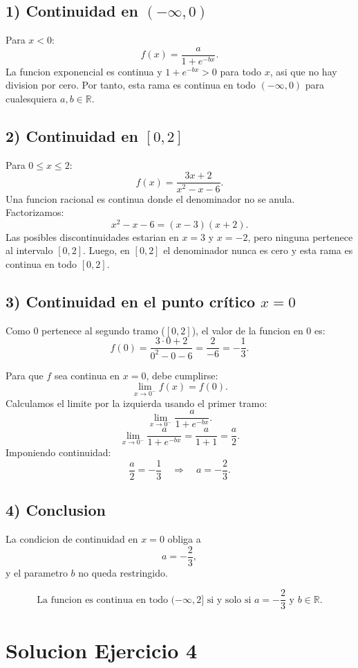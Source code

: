 \documentclass[12pt]{article}
\begin{document}
\subsection*{1) Continuidad en $(-\infty,0)$}
Para $x<0$:
\[
f(x)=\frac{a}{1+e^{-bx}}.
\]
La funcion exponencial es continua y $1+e^{-bx}>0$ para todo $x$, asi que no hay division por cero.
Por tanto, esta rama es continua en todo $(-\infty,0)$ para cualesquiera $a,b\in\mathbb{R}$.

\subsection*{2) Continuidad en $[0,2]$}
Para $0\le x\le 2$:
\[
f(x)=\frac{3x+2}{x^2-x-6}.
\]
Una funcion racional es continua donde el denominador no se anula. Factorizamos:
\[
x^2-x-6=(x-3)(x+2).
\]
Las posibles discontinuidades estarian en $x=3$ y $x=-2$, pero ninguna pertenece al intervalo $[0,2]$.
Luego, en $[0,2]$ el denominador nunca es cero y esta rama es continua en todo $[0,2]$.

\subsection*{3) Continuidad en el punto crítico $x=0$}
Como $0$ pertenece al segundo tramo ($[0,2]$), el valor de la funcion en $0$ es:
\[
f(0)=\frac{3\cdot 0+2}{0^2-0-6}=\frac{2}{-6}=-\frac{1}{3}.
\]

Para que $f$ sea continua en $x=0$, debe cumplirse:
\[
\lim_{x\to 0^-} f(x)=f(0).
\]
Calculamos el limite por la izquierda usando el primer tramo:
\[
\lim_{x\to 0^-}\frac{a}{1+e^{-bx}}.
\]
\[
\lim_{x\to 0^-}\frac{a}{1+e^{-bx}}
=\frac{a}{1+1}=\frac{a}{2}.
\]
Imponiendo continuidad:
\[
\frac{a}{2}=-\frac{1}{3}
\quad\Longrightarrow\quad
a=-\frac{2}{3}.
\]

\subsection*{4) Conclusion}
La condicion de continuidad en $x=0$ obliga a
\[
a=-\frac{2}{3},
\]
y el parametro $b$ no queda restringido.

\[
\boxed{\text{La funcion es continua en todo }(-\infty,2]\text{ si y solo si } a=-\frac{2}{3}\text{ y } b\in\mathbb{R}.}
\]

\section*{Solucion Ejercicio 4}
\end{document}
